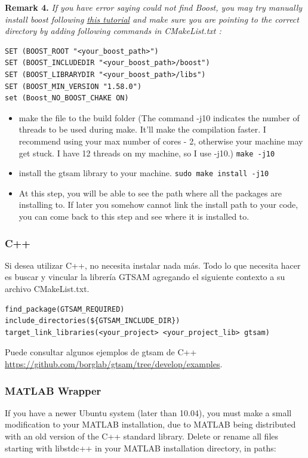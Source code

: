 \documentclass[tp]{lcc}
\begin{document}
\textbf{Remark 4.} \textit{If you have error saying could not find Boost, you may try manually install boost following \href{https://www.boost.org/doc/libs/1_66_0/more/getting_started/unix-variants.html\#get-boost}{this tutorial} and make sure you are pointing to the correct directory by adding following commands in CMakeList.txt :}

\begin{lstlisting}[style=bash]
SET (BOOST_ROOT "<your_boost_path>")
SET (BOOST_INCLUDEDIR "<your_boost_path>/boost")
SET (BOOST_LIBRARYDIR "<your_boost_path>/libs")
SET (BOOST_MIN_VERSION "1.58.0")
set (Boost_NO_BOOST_CHAKE ON)
\end{lstlisting}

\begin{itemize}
    \item make the file to the build folder (The command -j10 indicates the number of threads to be used during make. It'll make the compilation faster. I recommend using your max number of cores - 2, otherwise your machine may get stuck. I have 12 threads on my machine, so I use -j10.) \lstinline[style=bash]{make -j10}
    \item install the gtsam library to your machine. \lstinline[style=bash]{sudo make install -j10}
    \item At this step, you will be able to see the path where all the packages are installing to. If later you somehow cannot link the install path to your code, you can come back to this step and see where it is installed to.
\end{itemize}

\subsubsection*{C++}
Si desea utilizar C++, no necesita instalar nada más. Todo lo que necesita hacer es buscar y vincular la librería GTSAM agregando el siguiente contexto a su archivo CMakeList.txt.

\begin{lstlisting}[style=cmake]
find_package(GTSAM_REQUIRED)
include_directories(${GTSAM_INCLUDE_DIR})
target_link_libraries(<your_project> <your_project_lib> gtsam)
\end{lstlisting}

Puede consultar algunos ejemplos de gtsam de C++ \url{https://github.com/borglab/gtsam/tree/develop/examples}.

\subsubsection*{MATLAB Wrapper}
If you have a newer Ubuntu system (later than 10.04), you must make a small modification to your MATLAB installation, due to MATLAB being distributed with an old version of the C++ standard library. Delete or rename all files starting with libstdc++ in your MATLAB installation directory, in paths:
\end{document}
